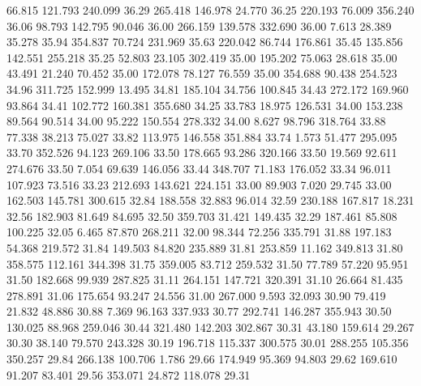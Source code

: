   66.815  121.793  240.099        36.29
 265.418  146.978   24.770        36.25
 220.193   76.009  356.240        36.06
  98.793  142.795   90.046        36.00
 266.159  139.578  332.690        36.00
   7.613   28.389   35.278        35.94
 354.837   70.724  231.969        35.63
 220.042   86.744  176.861        35.45
 135.856  142.551  255.218        35.25
  52.803   23.105  302.419        35.00
 195.202   75.063   28.618        35.00
  43.491   21.240   70.452        35.00
 172.078   78.127   76.559        35.00
 354.688   90.438  254.523        34.96
 311.725  152.999   13.495        34.81
 185.104   34.756  100.845        34.43
 272.172  169.960   93.864        34.41
 102.772  160.381  355.680        34.25
  33.783   18.975  126.531        34.00
 153.238   89.564   90.514        34.00
  95.222  150.554  278.332        34.00
   8.627   98.796  318.764        33.88
  77.338   38.213   75.027        33.82
 113.975  146.558  351.884        33.74
   1.573   51.477  295.095        33.70
 352.526   94.123  269.106        33.50
 178.665   93.286  320.166        33.50
  19.569   92.611  274.676        33.50
   7.054   69.639  146.056        33.44
 348.707   71.183  176.052        33.34
  96.011  107.923   73.516        33.23
 212.693  143.621  224.151        33.00
  89.903    7.020   29.745        33.00
 162.503  145.781  300.615        32.84
 188.558   32.883   96.014        32.59
 230.188  167.817   18.231        32.56
 182.903   81.649   84.695        32.50
 359.703   31.421  149.435        32.29
 187.461   85.808  100.225        32.05
   6.465   87.870  268.211        32.00
  98.344   72.256  335.791        31.88
 197.183   54.368  219.572        31.84
 149.503   84.820  235.889        31.81
 253.859   11.162  349.813        31.80
 358.575  112.161  344.398        31.75
 359.005   83.712  259.532        31.50
  77.789   57.220   95.951        31.50
 182.668   99.939  287.825        31.11
 264.151  147.721  320.391        31.10
  26.664   81.435  278.891        31.06
 175.654   93.247   24.556        31.00
 267.000    9.593   32.093        30.90
  79.419   21.832   48.886        30.88
   7.369   96.163  337.933        30.77
 292.741  146.287  355.943        30.50
 130.025   88.968  259.046        30.44
 321.480  142.203  302.867        30.31
  43.180  159.614   29.267        30.30
  38.140   79.570  243.328        30.19
 196.718  115.337  300.575        30.01
 288.255  105.356  350.257        29.84
 266.138  100.706    1.786        29.66
 174.949   95.369   94.803        29.62
 169.610   91.207   83.401        29.56
 353.071   24.872  118.078        29.31
